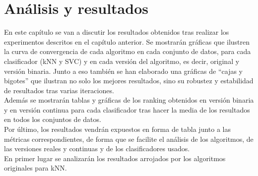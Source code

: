 \chapter{Análisis y resultados}
En este capítulo se van a discutir los resultados obtenidos tras realizar los experimentos descritos en el capítulo anterior. Se mostrarán gráficas que ilustren la curva de convergencia de cada algoritmo en cada conjunto de datos, para cada clasificador (kNN y SVC) y en cada versión del algoritmo, es decir, original y versión binaria. Junto a eso también se han elaborado una gráficas de ``cajas y bigotes'' que ilustran no solo los mejores resultados, sino su robustez y estabilidad de resultados tras varias iteraciones. \\[6pt]
Además se mostrarán tablas y gráficas de los ranking obtenidos en versión binaria y en versión continua para cada clasificador tras hacer la media de los resultados en todos los conjuntos de datos.\\[6pt]
Por último, los resultados vendrán expuestos en forma de tabla junto a las métricas correspondientes, de forma que se facilite el análisis de los algoritmos, de las versiones reales y continuas y de los clasificadores usados.\\[6pt]
En primer lugar se analizarán los resultados arrojados por los algoritmos originales para kNN.

